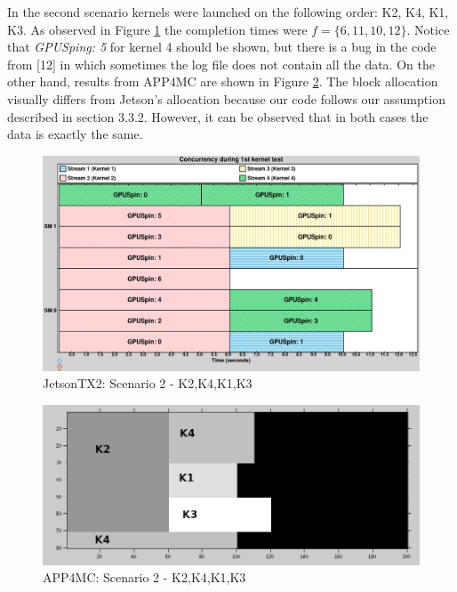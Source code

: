 \documentclass[
  12pt,
  a4paperpaper,
]{report}
\begin{document}
In the second scenario kernels were launched on the following order: K2,
K4, K1, K3. As observed in Figure \ref{img:nvidia-ex02} the completion
times were \(f = \{6,11,10,12\}\). Notice that \emph{GPUSping: 5} for
kernel 4 should be shown, but there is a bug in the code from {[}12{]}
in which sometimes the log file does not contain all the data. On the
other hand, results from APP4MC are shown in Figure
\ref{img:octave-ex02}. The block allocation visually differs from Jetson's
allocation because our code follows our assumption described in section
3.3.2. However, it can be observed that in both cases the data is exactly the same.  

\begin{figure}
\centering
\includegraphics[width=1\textwidth,height=\textheight]{source/figures/nvidia/ex02.png}
\caption{JetsonTX2: Scenario 2 - K2,K4,K1,K3 \label{img:nvidia-ex02}}
\end{figure}

\begin{figure}
\centering
\includegraphics[width=1\textwidth,height=\textheight]{source/figures/octave/ex02.png}
\caption{APP4MC: Scenario 2 - K2,K4,K1,K3 \label{img:octave-ex02}}
\end{figure}
\end{document}
